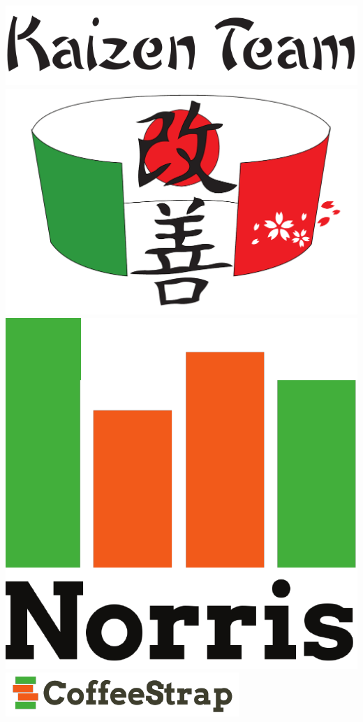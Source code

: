 \begin{titlepage}
  \begin{center}
	
	\includegraphics{Pics/KaizenTeam} \\ [1cm]
	
	\includegraphics[scale=0.6]{Pics/Logo} \\ [2cm]

	\includegraphics[scale=0.3]{Pics/Norris} \\ [1cm]
	\includegraphics[scale=1]{Pics/CoffeeStrap} \\ [2cm]


\end{center}
\end{titlepage}
